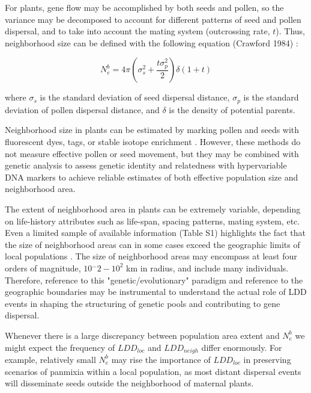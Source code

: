 \documentclass[a4paper, 12pt]{article}
\begin{document}
\begin{linenumbers}
For plants, gene flow may be accomplished by both seeds and pollen, so the variance may be decomposed to account for different patterns of seed and pollen dispersal, and to take into account the mating system (outcrossing rate, $t$). Thus, neighborhood size can be defined with the following equation (Crawford 1984) :

\begin{equation}
  		N^b_e = 4 \pi (\sigma^2_s + \frac{t \sigma^2_p}{2}) \delta (1 + t)
\end{equation}

where $\sigma_s$ is the standard deviation of seed dispersal distance, $\sigma_p$ is the standard deviation of pollen dispersal distance, and $\delta$ is the density of potential parents.

Neighborhood size in plants can be estimated by marking pollen and seeds with fluorescent dyes, tags, or stable isotope enrichment \citep{Carlo:2009wa}. However, these methods do not measure effective pollen or seed movement, but they may be combined with genetic analysis to assess genetic identity and relatedness with hypervariable DNA markers \citep{Levin:1988fm,Nason:1998aa,Godoy:2001} to achieve reliable estimates of both effective population size and neighborhood area. 

The extent of neighborhood area in plants can be extremely variable, depending on life-history attributes such as life-span, spacing patterns, mating system, etc. Even a limited sample of available information (Table S1) highlights the fact that the size of neighborhood areas can in some cases exceed the geographic limits of local populations \citep{Nason:1998aa}. The size of neighborhood areas may encompass at least four orders of magnitude, $10{^-2}-10^2$ km in radius, and include many individuals. Therefore, reference to this "genetic/evolutionary" paradigm and reference to the geographic boundaries \citep[sensu][]{Waples:2006ev} may be instrumental to understand the actual role of LDD events in shaping the structuring of genetic pools and contributing to gene dispersal. 

Whenever there is a large discrepancy between population area extent and $N^b_e$ we might expect the frequency of $LDD_{loc}$ and $LDD_{neigh}$ differ enormously. For example, relatively small $N^b_e$ may rise the importance of $LDD_{loc}$ in preserving scenarios of panmixia within a local population, as most distant dispersal events will disseminate seeds outside the neighborhood of maternal plants.



\end{linenumbers}
\end{document}
